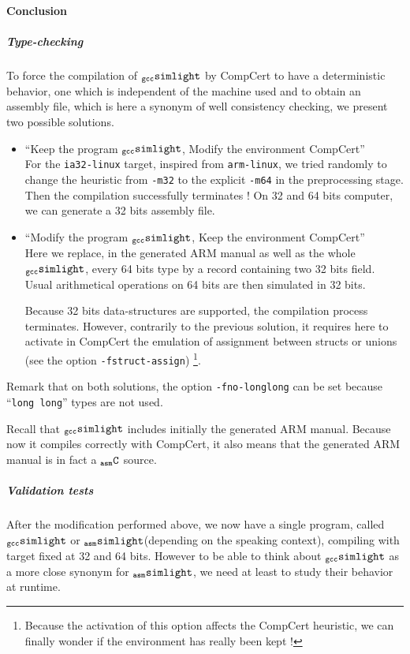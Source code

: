 \documentclass[a4paper, 11pt]{article}
\newcommand{\ccert}{CompCert\xspace}
\newcommand{\gccSL}{$_{\tt gcc}{\tt simlight}$\xspace}
\newcommand{\aSL}{$_{\tt asm}{\tt simlight}$\xspace} %
\newcommand{\aC}{$_{\tt asm}{\tt C}$\xspace}
\begin{document}
\paragraph{Conclusion}
\subparagraph{Type-checking}
To force the compilation of \gccSL by \ccert to have a deterministic behavior, one which is independent of the machine used and to obtain an assembly file, which is here a synonym of well consistency checking, we present two possible solutions.
\begin{itemize}
\item ``Keep the program \gccSL, Modify the environment \ccert''\\
For the \verb|ia32-linux| target, inspired from \verb|arm-linux|, we tried randomly to change the heuristic from \verb|-m32| to the explicit \verb|-m64| in the preprocessing stage. Then the compilation successfully terminates ! On 32 and 64 bits computer, we can generate a 32 bits assembly file.

\item ``Modify the program \gccSL, Keep the environment \ccert''\\
Here we replace, in the generated ARM manual as well as the whole \gccSL, every 64 bits type by a record containing two 32 bits field. Usual arithmetical operations on 64 bits are then simulated in 32 bits. 

Because 32 bits data-structures are supported, the compilation process terminates. 
However, contrarily to the previous solution, it requires here to activate in \ccert the emulation of assignment between structs or unions (see the option \verb|-fstruct-assign|) \footnote{Because the activation of this option affects the \ccert heuristic, we can finally wonder if the environment has really been kept !}.
\end{itemize}

Remark that on both solutions, the option \verb|-fno-longlong| can be set because ``\verb|long long|'' types are not used.

Recall that \gccSL includes initially the generated ARM manual. Because now it compiles correctly with \ccert, it also means that the generated ARM manual is in fact a \aC source.

\subparagraph{Validation tests}
\label{s:valid_test}
After the modification performed above, we now have a single program, called \gccSL or \aSL (depending on the speaking context), compiling with target fixed at 32 and 64 bits. However to be able to think about \gccSL as a more close synonym for \aSL, we need at least to study their behavior at runtime. 
\end{document}
